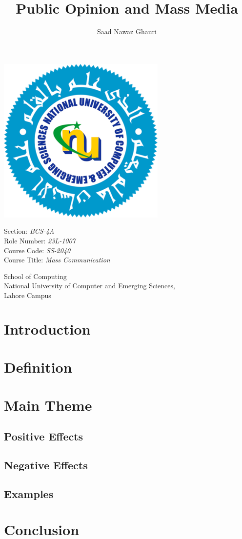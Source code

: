\documentclass[a4paper,12pt]{article}
\author{Saad Nawaz Ghauri}
\title{Public Opinion and Mass Media}
\begin{document}
\maketitle

\begin{Center}
\includegraphics{nuces_logo.png}
\end{Center}

\begin{Center}
    Section: \emph{BCS-4A} \\
    Role Number: \emph{23L-1007} \\
    Course Code: \emph{SS-2040} \\
    Course Title: \emph{Mass Communication} \\
\end{Center}

\begin{Center}
    School of Computing \\
    National University of Computer and Emerging Sciences, \\
    Lahore Campus \\
\end{Center}

\newpage

\tableofcontents


\section{Introduction}

\section{Definition}

\section{Main Theme}
\subsection{Positive Effects}
\subsection{Negative Effects}
\subsection{Examples}

\section{Conclusion}
\end{document}
